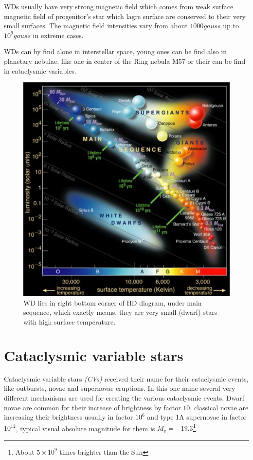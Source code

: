\documentclass[oneside,a4paper,11pt]{report}
\begin{document}
WDs usually have very strong magnetic field which comes from weak surface magnetic field of progenitor's star which lagre surface are conserved to their very 
small surfaces. The magnetic field intensities vary from about $1000 gauss$ up to $10^9 gauss$ in extreme cases.    

WDs can by find alone in interstellar space, young ones can be find also in planetary nebulae, like one  in center of the Ring nebula 
M57 or their can be find in cataclysmic variables.       
 
\begin{figure}[hbt!]
\centering
\includegraphics[totalheight=12cm]{hrdiagram}
\caption{WD lies in right bottom corner of HD diagram, under main 
sequence, which exactly means, they are very small (dwarf) stars with high surface temperature.  }
\label{hrd1} 
\end{figure}


\chapter{Cataclysmic variable stars}

Cataclysmic variable stars \textit{(CVs)} received their name for their cataclysmic events, like outbursts, novae and supernovae eruptions. 
In this one name several very different mechanisms are used for creating the various cataclysmic events.         
Dwarf novae are common for their increase of brightness by factor $10$, classical novae are increasing their 
brightness usually in factor $10^6$ and type 1A supernovae in factor $10^{12}$, typical visual absolute magnitude 
for them is $M_v = -19.3$\footnote{About $5\times10^9$ times brighter than the Sun}.  
\end{document}
